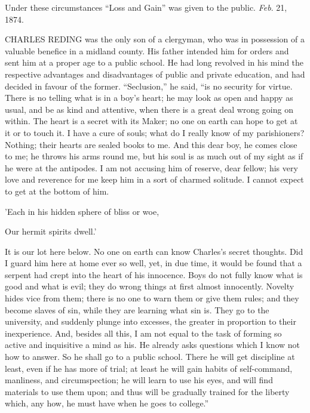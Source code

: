 Under these circumstances ``Loss and Gain'' was
given to the public.
\emph{Feb}. 21, 1874.



CHARLES REDING was
the only son of a clergyman, who was in possession of a valuable
benefice in a midland county. His father intended him for orders and
sent him at a proper age to a public school. He had long revolved in
his mind the respective advantages and disadvantages of public and
private education, and had decided in favour of the former.
``Seclusion,'' he said, ``is no security for virtue. There
is no telling what is in a boy's heart; he may look as open and happy
as usual, and be as kind and attentive, when there is a great deal
wrong going on within. The heart is a secret with its Maker; no one on
earth can hope to get at it or to touch it. I have a cure of souls;
what do I really know of my parishioners? Nothing; their hearts are
sealed books to me. And this dear boy, he comes close to me; he throws
his arms round me, but his soul is as much out of my sight as if he
were at the antipodes. I am not accusing him of reserve, dear
fellow; his very love and reverence for me keep him in a sort of
charmed solitude. I cannot expect to get at the bottom of him.

'Each in his hidden sphere of bliss or woe,

Our hermit spirits dwell.'

It is our lot here below. No one on earth can know Charles's secret
thoughts. Did I guard him here at home ever so well, yet, in due time,
it would be found that a serpent had crept into the heart of his
innocence. Boys do not fully know what is good and what is evil; they
do wrong things at first almost innocently. Novelty hides vice from
them; there is no one to warn them or give them rules; and they become
slaves of sin, while they are learning what sin is. They go to the
university, and suddenly plunge into excesses, the greater in
proportion to their inexperience. And, besides all this, I am not
equal to the task of forming so active and inquisitive a mind as his.
He already asks questions which I know not how to answer. So he shall
go to a public school. There he will get discipline at least, even if
he has more of trial; at least he will gain habits of self-command,
manliness, and circumspection; he will learn to use his eyes, and will
find materials to use them upon; and thus will be gradually trained
for the liberty which, any how, he must have when he goes to
college.''


